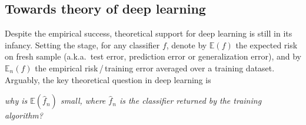 \subsection{Towards theory of deep learning}

Despite the empirical success, theoretical support for deep learning is still in its infancy. Setting the stage, for any classifier $f$, denote by $\mathbb{E}(f)$ the expected risk on fresh sample (a.k.a.~test error, prediction error or generalization error), and by $\mathbb{E}_n(f)$ the empirical risk$\,$/$\,$training error averaged over a training dataset. Arguably, the key theoretical question in deep learning is %
\begin{center}
\emph{why is $\mathbb{E}(\hat{f}_{n})$ small, where $\hat{f}_{n}$ is the classifier returned by the training algorithm?}
\end{center}

